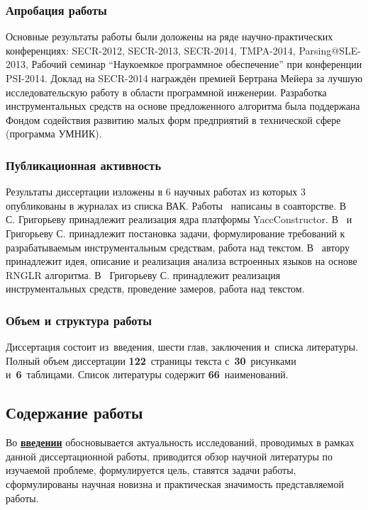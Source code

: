 \subsubsection*{\large{Апробация работы}}

Основные результаты работы были доложены на ряде научно-практических конференциях: SECR-2012, SECR-2013, SECR-2014, TMPA-2014, Parsing@SLE-2013, Рабочий семинар ``Наукоемкое программное обеспечение'' при конференции PSI-2014. Доклад на SECR-2014 награждён премией Бертрана Мейера за лучшую исследовательскую работу в области программной инженерии. Разработка инструментальных средств на основе предложенного алгоритма была поддержана Фондом содействия развитию малых форм предприятий в технической сфере (программа УМНИК).

\subsubsection*{\large{Публикационная активность}}

Результаты диссертации изложены в 6 научных работах из которых 3~\cite{1,2,3} опубликованы в журналах из списка ВАК. Работы~\cite{1, 2, 3, 4, 5, 6} написаны в соавторстве. В~\cite{1} С. Григорьеву принадлежит реализация ядра платформы YaccConstructor. В~\cite{2, 3} и~\cite{5} Григорьеву С. принадлежит постановка задачи, формулирование требований к разрабатываемым инструментальным средствам, работа над текстом. В~\cite{4} автору принадлежит идея, описание и реализация анализа встроенных языков на основе RNGLR алгоритма.  В~\cite{6} Григорьеву С. принадлежит реализация инструментальных средств, проведение замеров, работа над текстом.


\subsubsection*{\large{Объем и структура работы}}
Диссертация состоит из~введения, шести глав, заключения и~списка литературы. Полный объем диссертации \textbf{122}~страницы текста с~\textbf{30}~рисунками и~\textbf{6}~таблицами. Список литературы содержит \textbf{66}~наименований.

\newpage
\subsection*{\Large Содержание работы}
Во \underline{\textbf{введении}} обосновывается актуальность исследований, проводимых в рамках данной диссертационной работы, приводится обзор научной литературы по изучаемой проблеме, формулируется цель, 
ставятся задачи работы, сформулированы научная новизна и практическая значимость представляемой работы.


